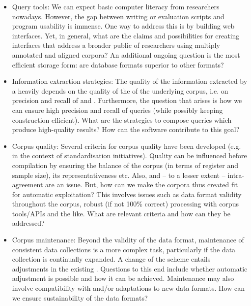 \documentclass[output=paper]{LSP/langsci}
\begin{document}
\begin{itemize}
\item 
Query tools: We can expect basic computer literacy from researchers nowadays. However, the gap between writing  or evaluation scripts and program usability is immense. One way to address this is by building web  interfaces. Yet, in general, what are the claims and possibilities for creating interfaces that address a broader public of researchers using multiply annotated and aligned corpora? An additional ongoing question is the most efficient storage form: are database formats superior to other formats? 
  
\item 
Information extraction strategies: The quality of the information extracted by a  heavily depends on the quality of the  of the underlying corpus, i.e. on precision and recall of  and . Furthermore, the question that arises is how we can ensure high precision and recall of queries (while possibly keeping  construction efficient). What are the strategies to compose queries which produce high-quality results? How can the  software contribute to this goal? 
\item 
Corpus quality: Several criteria for corpus quality have been developed (e.g. in the context of standardisation initiatives). Quality can be influenced before compilation by ensuring the balance of the corpus (in terms of register and sample size), its representativeness etc. Also,  and -- to a lesser extent -- intra- agreement are an issue. But, how can we make the corpora thus created fit for automatic exploitation? This involves issues such as data format validity throughout the corpus, robust (if not 100\% correct) processing with corpus tools/APIs and the like. What are relevant criteria and how can they be addressed? 
\item 
Corpus maintenance: Beyond the validity of the data format, maintenance of consistent data collections is a more complex task, particularly if the data collection is continually expanded. A change of the  scheme entails adjustments in the existing . Questions to this end include whether automatic adjustment is possible and how it can be achieved. Maintenance may also involve compatibility with and/or adaptations to new data formats. How can we ensure sustainability of the data formats? 
\end{itemize}
\end{document}
